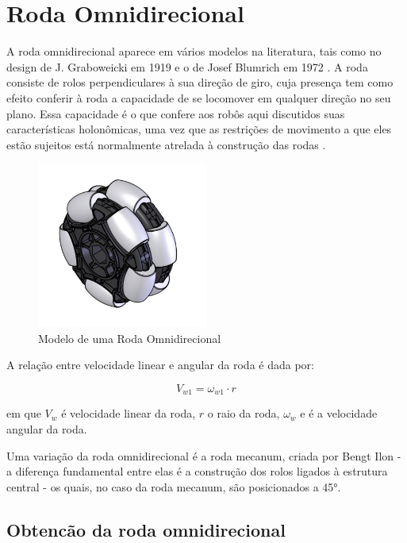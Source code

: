 
\section{Roda Omnidirecional}

A roda omnidirecional aparece em vários modelos na literatura, tais como no design de J. Graboweicki em 1919
\cite{patent_US1305535A} e o de Josef Blumrich em 1972 \cite{patent_US3789947A}. A roda consiste de rolos
perpendiculares à  sua direção de giro, cuja presença tem como efeito conferir à roda a capacidade de se locomover em
qualquer direção no seu plano. Essa capacidade é o que confere aos robôs aqui discutidos suas características
holonômicas, uma vez que as restrições de movimento a que eles estão sujeitos está normalmente atrelada à construção das
rodas \cite{TAKAHASHI}.

\begin{figure}[h] 
	\centering
	\caption{Modelo de uma Roda Omnidirecional}
	\includegraphics[width=0.5\textwidth]{figures/omniwheel}
\end{figure}

A relação entre velocidade linear e angular da roda é dada por:

\[V_{w1} = \omega_{w1}\cdot r \] 

em que $V_{w}$ é velocidade linear da roda, $r$ o raio da roda, $\omega_{w} $ e é a velocidade angular da roda.

Uma variação da roda omnidirecional é a roda mecanum, criada por Bengt Ilon \cite{patent_US3876255A} - a diferença
fundamental entre elas é a construção dos rolos ligados à estrutura central - os quais, no caso da roda mecanum, são
posicionados a 45°.

\subsection{Obtencão da roda omnidirecional}

